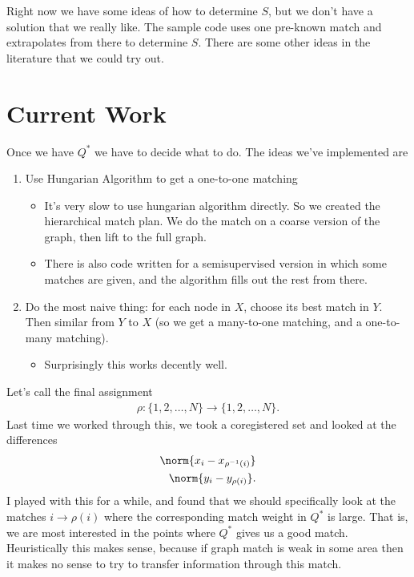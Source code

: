 \documentclass[12pt]{article}
\begin{document}
Right now we have some ideas of how to determine $S$, but we don't have a
solution that we really like. The sample code uses one pre-known match and
extrapolates from there to determine $S$. There are some other ideas in the
literature that we could try out.

\section*{Current Work}

Once we have $Q^*$ we have to decide what to do. The ideas we've implemented are
\begin{enumerate}
\item Use Hungarian Algorithm to get a one-to-one matching
  \begin{itemize}
  \item It's very slow to use hungarian algorithm directly. So we created the
    hierarchical match plan. We do the match on a coarse version of the graph,
    then lift to the full graph.
  \item There is also code written for a semisupervised version in which some
    matches are given, and the algorithm fills out the rest from there.
  \end{itemize}
\item Do the most naive thing: for each node in $X$, choose its best match in
  $Y$. Then similar from $Y$ to $X$ (so we get a many-to-one matching, and a
  one-to-many matching).
  \begin{itemize}
  \item Surprisingly this works decently well.
  \end{itemize}
\end{enumerate}

Let's call the final assignment
\begin{align}
  \rho: \{1,2,\ldots,N\} \to \{1,2,\ldots,N\}.
\end{align}
Last time we worked through this, we took a coregistered set and looked at the
differences
\begin{align}
  \norm{x_i - x_{\rho^{-1}(i)}} \nonumber \\ 
  \norm{y_i - y_{\rho(i)}}.
\end{align}
I played with this for a while, and found that we should specifically look at
the matches $i \to \rho(i)$ where the corresponding match weight in $Q^*$ is
large. That is, we are most interested in the points where $Q^*$ gives us a good
match. Heuristically this makes sense, because if graph match is weak in some
area then it makes no sense to try to transfer information through this match.
\end{document}
